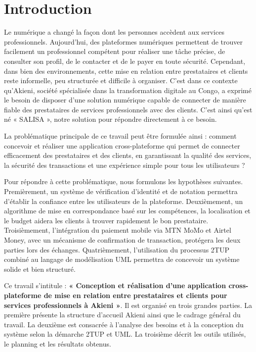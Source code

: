 \chapter*{Introduction}
\pagestyle{styleGlobal}
\label{sec:introduction}

Le numérique a changé la façon dont les personnes accèdent aux services professionnels. Aujourd'hui, des plateformes numériques permettent de trouver facilement un professionnel compétent pour réaliser une tâche précise, de consulter son profil, de le contacter et de le payer en toute sécurité. Cependant, dans bien des environnements, cette mise en relation entre prestataires et clients reste informelle, peu structurée et difficile à organiser. C'est dans ce contexte qu'Akieni, société spécialisée dans la transformation digitale au Congo, a exprimé le besoin de disposer d'une solution numérique capable de connecter de manière fiable des prestataires de services professionnels avec des clients. C'est ainsi qu'est né « SALISA », notre solution pour répondre directement à ce besoin.

La problématique principale de ce travail peut être formulée ainsi : comment concevoir et réaliser une application cross-plateforme qui permet de connecter efficacement des prestataires et des clients, en garantissant la qualité des services, la sécurité des transactions et une expérience simple pour tous les utilisateurs ?

Pour répondre à cette problématique, nous formulons les hypothèses suivantes. Premièrement, un système de vérification d'identité et de notation permettra d'établir la confiance entre les utilisateurs de la plateforme. Deuxièmement, un algorithme de mise en correspondance basé sur les compétences, la localisation et le budget aidera les clients à trouver rapidement le bon prestataire. Troisièmement, l'intégration du paiement mobile via MTN MoMo et Airtel Money,
avec un mécanisme de confirmation de transaction, protégera les deux parties lors des échanges. Quatrièmement, l'utilisation du processus 2TUP combiné au langage de modélisation UML permettra de concevoir un système solide et bien structuré.

Ce travail s'intitule : \textbf{« Conception et réalisation d'une application cross-plateforme de mise en relation entre prestataires et clients pour services professionnels à Akieni »}. Il est organisé en trois grandes parties. La première présente la structure d'accueil Akieni ainsi que le cadrage général du travail. La deuxième est consacrée à l'analyse des besoins et à la conception du système selon la démarche 2TUP et UML. La troisième décrit les outils utilisés, le planning et les résultats obtenus.